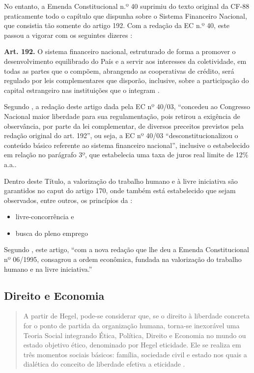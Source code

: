 \documentclass[]{article}
\providecommand{\tightlist}{%
  \setlength{\itemsep}{0pt}\setlength{\parskip}{0pt}}
\begin{document}
No entanto, a Emenda Constitucional n.º 40 suprimiu do texto original da
CF-88 praticamente todo o capítulo que dispunha sobre o Sistema
Financeiro Nacional, que consistia tão somente do artigo 192. Com a
redação da EC n.º 40, este passou a vigorar com os seguintes dizeres
\cite{ec40}:

\textbf{Art. 192.} O sistema financeiro nacional, estruturado de forma a
promover o desenvolvimento equilibrado do País e a servir aos interesses
da coletividade, em todas as partes que o compõem, abrangendo as
cooperativas de crédito, será regulado por leis complementares que
disporão, inclusive, sobre a participação do capital estrangeiro nas
instituições que o integram \cite[art.~192]{cf88}.

Segundo , a redação deste artigo dada pela EC
nº 40/03, ``concedeu ao Congresso Nacional maior liberdade para sua
regulamentação, pois retirou a exigência de observância, por parte da
lei complementar, de diversos preceitos previstos pela redação original
do art. 192'', ou seja, a EC nº 40/03 ``desconstitucionalizou o conteúdo
básico referente ao sistema financeiro nacional'', inclusive o
estabelecido em relação no parágrafo 3º, que estabelecia uma taxa de
juros real limite de 12\% a.a..

Dentro deste Título, a valorização do trabalho humano e à livre
iniciativa são garantidos no caput do artigo 170, onde também está
estabelecido que sejam observados, entre outros, os princípios da
\cite[art. 170]{cf88}:

\begin{itemize}
\tightlist
\item
  livre-concorrência e
\item
  busca do pleno emprego
\end{itemize}

Segundo , este artigo, ``com a nova redação
que lhe deu a Emenda Constitucional nº 06/1995, consagrou a ordem
econômica, fundada na valorização do trabalho humano e na livre
iniciativa.''

\subsection{Direito e Economia}\label{sec:diretoeeconomia}

\begin{quote}
A partir de Hegel, pode-se considerar que, se o direito à liberdade
concreta for o ponto de partida da organização humana, torna-se
inexorável uma Teoria Social integrando Ética, Política, Direito e
Economia no mundo ou estado objetivo ético, denominado por Hegel
eticidade. Ele se realiza em três momentos sociais básicos: família,
sociedade civil e estado nos quais a dialética do conceito de liberdade
efetiva a eticidade \cite[p.~15]{drummond}.
\end{quote}
\end{document}
